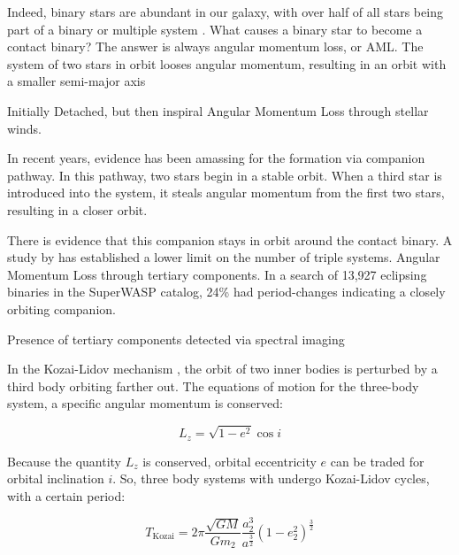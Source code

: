 \documentclass[12pt]{article} %
\numberwithin{equation}{section} %
\begin{document}
Indeed, binary stars are abundant in our galaxy, with over half of all stars being part of a binary or multiple system \citep{carroll2006introduction}. What causes a binary star to become a contact binary? The answer is always angular momentum loss, or AML. The system of two stars in orbit looses angular momentum, resulting in an orbit with a smaller semi-major axis

\citep{yildiz2013origin}

\citep{bilir2005kinematics}

\citep{li2007formation}

Initially Detached, but then inspiral
Angular Momentum Loss through stellar winds. 

In recent years, evidence has been amassing for the formation via companion pathway. In this pathway, two stars begin in a stable orbit. When a third star is introduced into the system, it steals angular momentum from the first two stars, resulting in a closer orbit. 

There is evidence that this companion stays in orbit around the contact binary.
A study by \citet{pribulla2006contact} has established a lower limit on the number of triple systems. Angular Momentum Loss through tertiary components.  \citep{lohr2015orbital} In a search of 13,927 eclipsing binaries in the SuperWASP catalog, 24\% had period-changes indicating a closely orbiting companion.

Presence of tertiary components detected via spectral imaging \citep{hendry1998detection}

In the Kozai-Lidov mechanism , the orbit of two inner bodies is perturbed by a third body orbiting farther out. The equations of motion for the three-body system, a specific angular momentum is conserved:

\begin{equation} \label{kozai_1}
L_{z} = \sqrt{1- e^{2}} \cos i
\end{equation}

Because the quantity $L_{z}$ is conserved, orbital eccentricity $e$ can be traded for orbital inclination $i$. So, three body systems with undergo Kozai-Lidov cycles, with a certain period:

\begin{equation} \label{kozai_2}
T_{\text{Kozai}} = 2 \pi \frac{\sqrt{GM}}{G m_{2}} \frac{a_{2}^{3}}{a^{\frac{3}{2}}} (1 - e^{2}_{2})^{\frac{3}{2}}
\end{equation}
\end{document}
